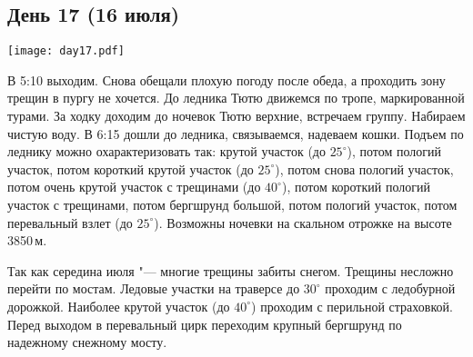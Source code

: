 \graphicspath{{Pictures/Chapter5/Day17}}

\subsection{День 17 (16 июля)}\label{subsec:Day17}
    \parbox[c]{0.95\textwidth}{%
        \texttt{[image: day17.pdf]}\label{fig:Day17_map}%
    }
    \vspace{0.8cm}

    В 5:10 выходим. Снова обещали плохую погоду после обеда, а проходить зону трещин в пургу не хочется. До ледника
    Тютю движемся по тропе, маркированной турами. За ходку доходим до ночевок Тютю верхние, встречаем группу.
    Набираем чистую воду. В 6:15 дошли до ледника, связываемся, надеваем кошки. Подъем по леднику можно
    охарактеризовать так: крутой участок (до $25^\circ$), потом пологий участок, потом короткий крутой участок
    (до $25^\circ$), потом снова пологий участок, потом очень крутой участок с трещинами (до $40^\circ$), потом
    короткий пологий участок с трещинами, потом бергшрунд большой, потом пологий участок, потом перевальный взлет
    (до $25^\circ$). Возможны ночевки на скальном отрожке на высоте 3850\,м.

    Так как середина июля "--- многие трещины забиты снегом. Трещины несложно перейти по мостам. Ледовые участки на
    траверсе до $30^\circ$ проходим с ледобурной дорожкой. Наиболее крутой участок (до $40^\circ$) проходим с
    перильной страховкой. Перед выходом в перевальный цирк переходим крупный бергшрунд по надежному снежному мосту.

